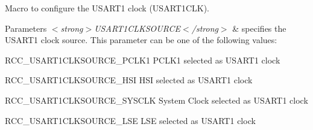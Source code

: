Macro to configure the U\+S\+A\+R\+T1 clock (U\+S\+A\+R\+T1\+C\+LK). 


\begin{DoxyParams}{Parameters}
{\em $<$strong$>$\+U\+S\+A\+R\+T1\+C\+L\+K\+S\+O\+U\+R\+C\+E$<$/strong$>$} & specifies the U\+S\+A\+R\+T1 clock source. This parameter can be one of the following values\+: \begin{DoxyItemize}
\item R\+C\+C\+\_\+\+U\+S\+A\+R\+T1\+C\+L\+K\+S\+O\+U\+R\+C\+E\+\_\+\+P\+C\+L\+K1 P\+C\+L\+K1 selected as U\+S\+A\+R\+T1 clock \item R\+C\+C\+\_\+\+U\+S\+A\+R\+T1\+C\+L\+K\+S\+O\+U\+R\+C\+E\+\_\+\+H\+SI H\+SI selected as U\+S\+A\+R\+T1 clock \item R\+C\+C\+\_\+\+U\+S\+A\+R\+T1\+C\+L\+K\+S\+O\+U\+R\+C\+E\+\_\+\+S\+Y\+S\+C\+LK System Clock selected as U\+S\+A\+R\+T1 clock \item R\+C\+C\+\_\+\+U\+S\+A\+R\+T1\+C\+L\+K\+S\+O\+U\+R\+C\+E\+\_\+\+L\+SE L\+SE selected as U\+S\+A\+R\+T1 clock \end{DoxyItemize}
\\
\hline
\end{DoxyParams}
